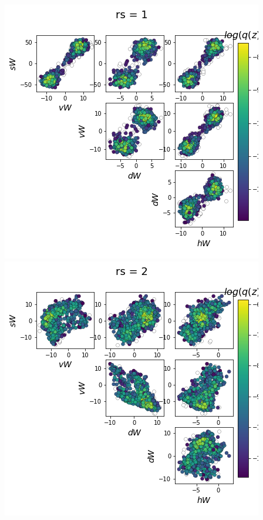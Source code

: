 \documentclass[11pt]{article}
\begin{document}
\begin{center}
\includegraphics[scale=0.33]{figs/Z_SC_reduced_c=0_p=50_rs=1.png}
\includegraphics[scale=0.33]{figs/Z_SC_reduced_c=0_p=50_rs=2.png}

\end{center}
\end{document}
